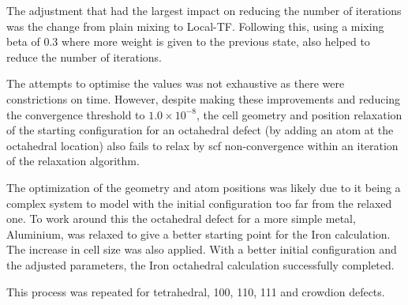 The adjustment that had the largest impact on reducing the number of iterations was the change from plain mixing to Local-TF.  Following this, using a mixing beta of 0.3 where more weight is given to the previous state, also helped to reduce the number of iterations.

The attempts to optimise the values was not exhaustive as there were constrictions on time.  However, despite making these improvements and reducing the convergence threshold to $1.0 \times 10^{-8}$, the cell geometry and position relaxation of the starting configuration for an octahedral defect (by adding an atom at the octahedral location) also fails to relax by \acrshort{scf} non-convergence within an iteration of the relaxation algorithm. 

The optimization of the geometry and atom positions was likely due to it being a complex system to model with the initial configuration too far from the relaxed one.  To work around this the octahedral defect for a more simple metal, Aluminium, was relaxed to give a better starting point for the Iron calculation.  The increase in cell size was also applied.  With a better initial configuration and the adjusted parameters, the Iron octahedral calculation successfully completed.

This process was repeated for tetrahedral, 100, 110, 111 and crowdion defects.














